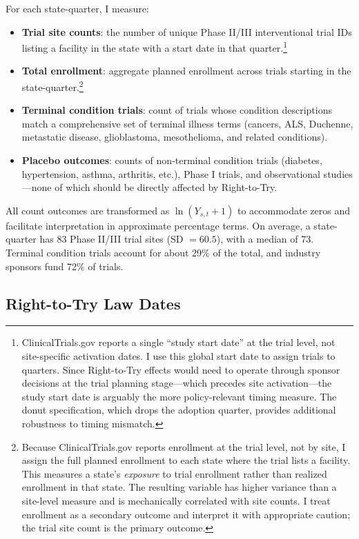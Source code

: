 \documentclass[12pt]{article}
\begin{document}
For each state-quarter, I measure:
\begin{itemize}
    \item \textbf{Trial site counts}: the number of unique Phase II/III interventional trial IDs listing a facility in the state with a start date in that quarter.\footnote{ClinicalTrials.gov reports a single ``study start date'' at the trial level, not site-specific activation dates. I use this global start date to assign trials to quarters. Since Right-to-Try effects would need to operate through sponsor decisions at the trial planning stage---which precedes site activation---the study start date is arguably the more policy-relevant timing measure. The donut specification, which drops the adoption quarter, provides additional robustness to timing mismatch.}
    \item \textbf{Total enrollment}: aggregate planned enrollment across trials starting in the state-quarter.\footnote{Because ClinicalTrials.gov reports enrollment at the trial level, not by site, I assign the full planned enrollment to each state where the trial lists a facility. This measures a state's \textit{exposure} to trial enrollment rather than realized enrollment in that state. The resulting variable has higher variance than a site-level measure and is mechanically correlated with site counts. I treat enrollment as a secondary outcome and interpret it with appropriate caution; the trial site count is the primary outcome.}
    \item \textbf{Terminal condition trials}: count of trials whose condition descriptions match a comprehensive set of terminal illness terms (cancers, ALS, Duchenne, metastatic disease, glioblastoma, mesothelioma, and related conditions).
    \item \textbf{Placebo outcomes}: counts of non-terminal condition trials (diabetes, hypertension, asthma, arthritis, etc.), Phase I trials, and observational studies---none of which should be directly affected by Right-to-Try.
\end{itemize}

All count outcomes are transformed as $\ln(Y_{s,t} + 1)$ to accommodate zeros and facilitate interpretation in approximate percentage terms. On average, a state-quarter has 83 Phase II/III trial sites (SD $= 60.5$), with a median of 73. Terminal condition trials account for about 29\% of the total, and industry sponsors fund 72\% of trials.

\subsection{Right-to-Try Law Dates}
\end{document}
